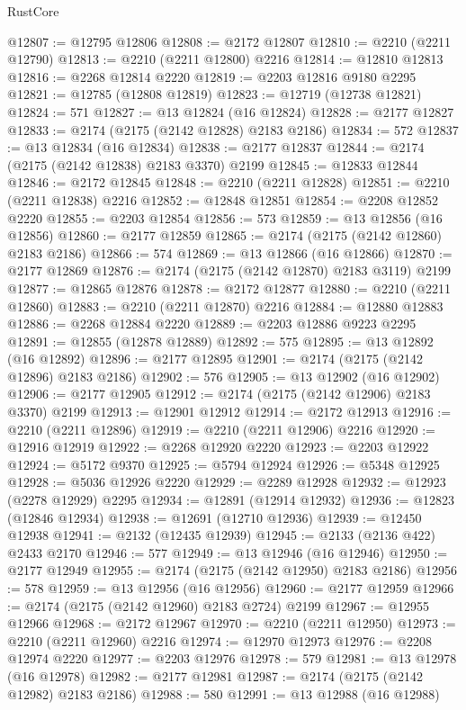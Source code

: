 \begin{lexlean}{RustCore}
\begin{coremodule}
@12807 := @12795 @12806
@12808 := @2172 @12807
@12810 := @2210 (@2211 @12790)
@12813 := @2210 (@2211 @12800) @2216
@12814 := @12810 @12813
@12816 := @2268 @12814 @2220
@12819 := @2203 @12816 @9180 @2295
@12821 := @12785 (@12808 @12819)
@12823 := @12719 (@12738 @12821)
@12824 := 571
@12827 := @13 @12824 (@16 @12824)
@12828 := @2177 @12827
@12833 := @2174 (@2175 (@2142 @12828) @2183 @2186)
@12834 := 572
@12837 := @13 @12834 (@16 @12834)
@12838 := @2177 @12837
@12844 := @2174 (@2175 (@2142 @12838) @2183 @3370) @2199
@12845 := @12833 @12844
@12846 := @2172 @12845
@12848 := @2210 (@2211 @12828)
@12851 := @2210 (@2211 @12838) @2216
@12852 := @12848 @12851
@12854 := @2208 @12852 @2220
@12855 := @2203 @12854
@12856 := 573
@12859 := @13 @12856 (@16 @12856)
@12860 := @2177 @12859
@12865 := @2174 (@2175 (@2142 @12860) @2183 @2186)
@12866 := 574
@12869 := @13 @12866 (@16 @12866)
@12870 := @2177 @12869
@12876 := @2174 (@2175 (@2142 @12870) @2183 @3119) @2199
@12877 := @12865 @12876
@12878 := @2172 @12877
@12880 := @2210 (@2211 @12860)
@12883 := @2210 (@2211 @12870) @2216
@12884 := @12880 @12883
@12886 := @2268 @12884 @2220
@12889 := @2203 @12886 @9223 @2295
@12891 := @12855 (@12878 @12889)
@12892 := 575
@12895 := @13 @12892 (@16 @12892)
@12896 := @2177 @12895
@12901 := @2174 (@2175 (@2142 @12896) @2183 @2186)
@12902 := 576
@12905 := @13 @12902 (@16 @12902)
@12906 := @2177 @12905
@12912 := @2174 (@2175 (@2142 @12906) @2183 @3370) @2199
@12913 := @12901 @12912
@12914 := @2172 @12913
@12916 := @2210 (@2211 @12896)
@12919 := @2210 (@2211 @12906) @2216
@12920 := @12916 @12919
@12922 := @2268 @12920 @2220
@12923 := @2203 @12922
@12924 := @5172 @9370
@12925 := @5794 @12924
@12926 := @5348 @12925
@12928 := @5036 @12926 @2220
@12929 := @2289 @12928
@12932 := @12923 (@2278 @12929) @2295
@12934 := @12891 (@12914 @12932)
@12936 := @12823 (@12846 @12934)
@12938 := @12691 (@12710 @12936)
@12939 := @12450 @12938
@12941 := @2132 (@12435 @12939)
@12945 := @2133 (@2136 @422) @2433 @2170
@12946 := 577
@12949 := @13 @12946 (@16 @12946)
@12950 := @2177 @12949
@12955 := @2174 (@2175 (@2142 @12950) @2183 @2186)
@12956 := 578
@12959 := @13 @12956 (@16 @12956)
@12960 := @2177 @12959
@12966 := @2174 (@2175 (@2142 @12960) @2183 @2724) @2199
@12967 := @12955 @12966
@12968 := @2172 @12967
@12970 := @2210 (@2211 @12950)
@12973 := @2210 (@2211 @12960) @2216
@12974 := @12970 @12973
@12976 := @2208 @12974 @2220
@12977 := @2203 @12976
@12978 := 579
@12981 := @13 @12978 (@16 @12978)
@12982 := @2177 @12981
@12987 := @2174 (@2175 (@2142 @12982) @2183 @2186)
@12988 := 580
@12991 := @13 @12988 (@16 @12988)

\end{coremodule}
\end{lexlean}
